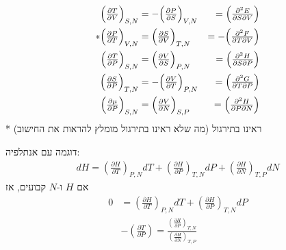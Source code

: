 \begin{cheatformula}\\
\begin{align*}
    \Bigl(\tfrac{\partial T}{\partial V}\Bigr)_{S,N} &= - \Bigl(\tfrac{\partial P}{\partial S}\Bigr)_{V,N} &= \Bigl(\tfrac{\partial^2 E}{\partial S \partial V}\Bigr) \\ 
    * \Bigl(\tfrac{\partial P}{\partial T}\Bigr)_{V,N} &= \Bigl(\tfrac{\partial S}{\partial V}\Bigr)_{T,N} &= - \Bigl(\tfrac{\partial^2 F}{\partial T \partial V}\Bigr) \\ 
    \Bigl(\tfrac{\partial T}{\partial P}\Bigr)_{S,N} &= \Bigl(\tfrac{\partial V}{\partial S}\Bigr)_{P,N} &=  \Bigl(\tfrac{\partial^2 H}{\partial S \partial P}\Bigr)\\
    \Bigl(\tfrac{\partial S}{\partial P}\Bigr)_{T,N} &= - \Bigl(\tfrac{\partial V}{\partial T}\Bigr)_{P,N} &= \Bigl(\tfrac{\partial^2 G}{\partial T \partial P}\Bigr)\\
    \Bigl(\tfrac{\partial \mu}{\partial P}\Bigr)_{S,N} &=  \Bigl(\tfrac{\partial V}{\partial N}\Bigr)_{S,P} &= \Bigl(\tfrac{\partial^2 H}{\partial P \partial N}\Bigr)
\end{align*}  
* ראינו בתירגול (מה שלא ראינו בתירגול מומלץ להראות את החישוב) 
\end{cheatformula}

\begin{cheatformula}
    דוגמה עם אנתלפיה:
\begin{align*} 
    dH = \left(\frac{\partial H}{\partial T}\right)_{P,N} dT + \left(\frac{\partial H}{\partial P}\right)_{T,N} dP + \left(\frac{\partial H}{\partial N}\right)_{T,P} dN
\end{align*}
אם $H$ ו-$N$ קבועים, אז
\begin{align*}
    0 &= \left(\frac{\partial H}{\partial T}\right)_{P,N} dT + \left(\frac{\partial H}{\partial P}\right)_{T,N} dP \\
     & - \left(\frac{\partial T}{\partial P}\right) = \frac{\left(\frac{\partial H}{\partial P}\right)_{T,N}}{\left(\frac{\partial H}{\partial N}\right)_{T,P}} 
\end{align*}
\end{cheatformula}
